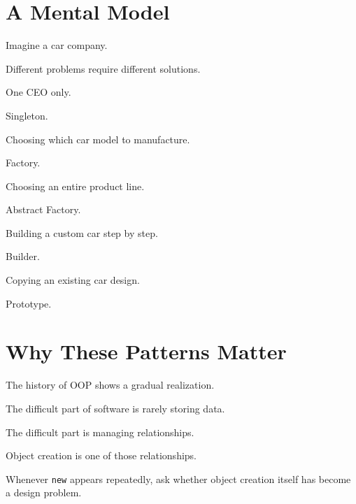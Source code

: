 \documentclass[11pt,a4paper]{book}
\begin{document}

\section{A Mental Model}

\begin{mentalmodel}

Imagine a car company.

Different problems require different solutions.

One CEO only.

Singleton.

Choosing which car model to manufacture.

Factory.

Choosing an entire product line.

Abstract Factory.

Building a custom car step by step.

Builder.

Copying an existing car design.

Prototype.

\end{mentalmodel}


\section{Why These Patterns Matter}

\begin{idea}

The history of OOP shows a gradual realization.

The difficult part of software is rarely storing data.

The difficult part is managing relationships.

Object creation is one of those relationships.

\end{idea}

\begin{rosettarule}

Whenever \texttt{new} appears repeatedly,
ask whether object creation itself has become a design problem.

\end{rosettarule}

\end{document}
